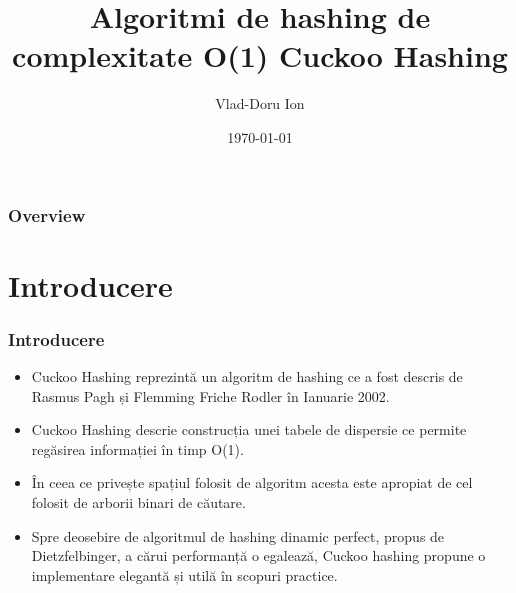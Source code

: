\documentclass{beamer}
\title[Cuckoo Hashing]{Algoritmi de hashing de complexitate O(1) Cuckoo Hashing} %
\author{Vlad-Doru Ion} %
\institute[UNIBUC] %
{
Universitatea din București \\ %
\medskip
}
\date{\today} %
\begin{document}
\begin{frame}
\titlepage %
\end{frame}

\begin{frame}
\frametitle{Overview} %
\tableofcontents %
\end{frame}


\section{Introducere}

\begin{frame}
\frametitle{Introducere}
\begin{itemize}
\item Cuckoo Hashing reprezintă un algoritm de hashing ce a fost descris de Rasmus Pagh și Flemming Friche Rodler în Ianuarie 2002.
\item Cuckoo Hashing descrie construcția unei tabele de dispersie ce permite regăsirea informației în timp O(1).
\item În ceea ce privește spațiul folosit de algoritm acesta este apropiat de cel folosit de arborii binari de căutare.
\item Spre deosebire de algoritmul de hashing dinamic perfect, propus de Dietzfelbinger, a cărui performanță o egalează, Cuckoo hashing propune o implementare elegantă și utilă în scopuri practice.
\end{itemize}

\end{frame}

\end{document}
